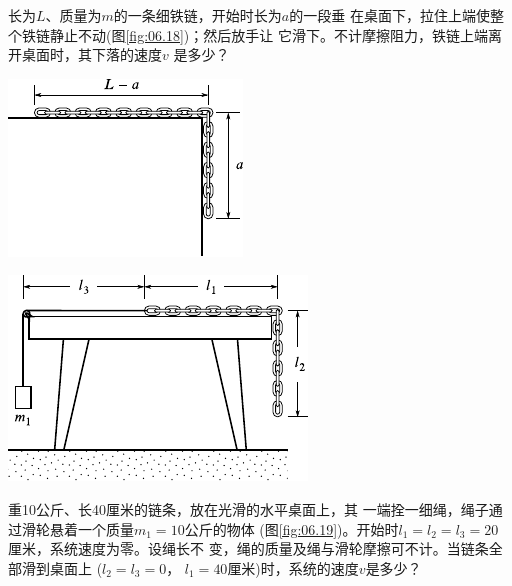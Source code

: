 \begin{exercises}
\exercise 长为$ L $、质量为$ m $的一条细铁链，开始时长为$ a $的一段垂
在桌面下，拉住上端使整个铁链静止不动(图\ref{fig:06.18})；然后放手让
它滑下。不计摩擦阻力，铁链上端离开桌面时，其下落的速度$ v $
是多少？
\vspace{1.56em}
\begin{figurex}
  \begin{minipage}[b]{0.4\linewidth}
    \centering
    \includegraphics{figure/fig06.18}
    \caption{}
    \label{fig:06.18}
  \end{minipage}
  \hfill
  \begin{minipage}[b]{0.6\linewidth}
    \centering
    \includegraphics{figure/fig06.19}
    \caption{}
    \label{fig:06.19}
  \end{minipage}
\end{figurex}

\exercise 重10公斤、长40厘米的链条，放在光滑的水平桌面上，其
一端拴一细绳，绳子通过滑轮悬着一个质量$ m _ { 1 } = 10 $公斤的物体
(图\ref{fig:06.19})。开始时$ l _ { 1 } = l _ { 2 } = l _ { 3 } = 20 $厘米，系统速度为零。设绳长不
变，绳的质量及绳与滑轮摩擦可不计。当链条全部滑到桌面上
($ l _ { 2 } = l _ { 3 } = 0 $， $ l _ { 1 } = 40 $厘米)时，系统的速度$ v $是多少？


\end{exercises}
